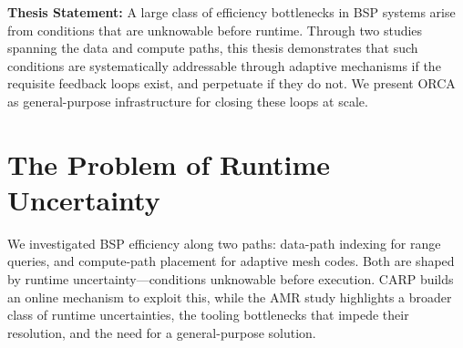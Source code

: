 \begin{tcolorbox}[thesisbox] 
  \textbf{Thesis Statement:} A large class of efficiency bottlenecks in BSP systems arise from
  conditions that are unknowable before runtime.
  Through two studies spanning the data and compute paths, this thesis demonstrates that such
  conditions are systematically addressable through adaptive mechanisms if the requisite feedback
  loops exist, and perpetuate if they do not.
  We present ORCA as general-purpose infrastructure for closing these loops at scale.
\end{tcolorbox}



\section{The Problem of Runtime Uncertainty}
\label{sec:intro:problem}

We investigated BSP efficiency along two paths: data-path indexing for range queries, and
compute-path placement for adaptive mesh codes.%
Both are shaped by runtime uncertainty---conditions unknowable before execution.
CARP builds an online mechanism to exploit this, while the AMR study highlights a broader class of
runtime uncertainties, the tooling bottlenecks that impede their resolution, and the need for a
general-purpose solution.


